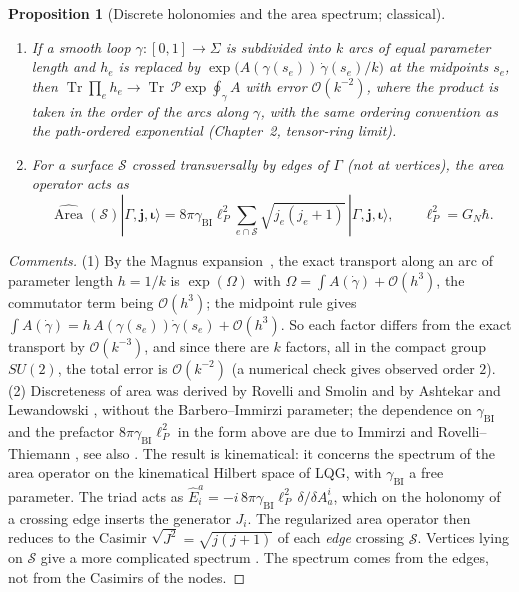 \documentclass[11pt,a4paper,reqno]{amsart}
\newtheorem{proposition}[theorem]{Proposition}
\theoremstyle{definition}
\numberwithin{equation}{section}
\newcommand{\Tr}{\operatorname{Tr}}
\providecommand{\Area}{\operatorname{Area}}
\begin{document}
\begin{proposition}[Discrete holonomies and the area spectrum; classical]
\label{thm:ashtekar_limit}
\leavevmode
\begin{enumerate}
    \item If a smooth loop $\gamma \colon [0,1] \to \Sigma$ is subdivided into $k$ arcs of equal parameter length and $h_e$ is replaced by $\exp\big(A(\gamma(s_e))\,\dot\gamma(s_e)/k\big)$ at the midpoints $s_e$, then $\Tr\prod_e h_e \to \Tr\,\mathcal{P}\exp\oint_\gamma A$ with error $\mathcal{O}(k^{-2})$, where the product is taken in the order of the arcs along $\gamma$, with the same ordering convention as the path-ordered exponential (Chapter~2, tensor-ring limit).
    \item For a surface $\mathcal{S}$ crossed transversally by edges of $\Gamma$ (not at vertices), the area operator acts as
    \begin{equation}
        \label{eq:area_spectrum}
        \widehat{\Area}(\mathcal{S}) |\Gamma, \mathbf{j}, \boldsymbol{\iota}\rangle = 8\pi \gamma_{\mathrm{BI}} \ell_P^2 \sum_{e \cap \mathcal{S}} \sqrt{j_e(j_e + 1)} \, |\Gamma, \mathbf{j}, \boldsymbol{\iota}\rangle, \qquad \ell_P^2 = G_N\hbar.
    \end{equation}
\end{enumerate}
\end{proposition}
\begin{proof}[Comments]
(1) By the Magnus expansion~\cite{magnus1954}, the exact transport along an arc of parameter length $h = 1/k$ is $\exp(\Omega)$ with $\Omega = \int A(\dot\gamma) + \mathcal{O}(h^3)$, the commutator term being $\mathcal{O}(h^3)$; the midpoint rule gives $\int A(\dot\gamma) = h\,A(\gamma(s_e))\dot\gamma(s_e) + \mathcal{O}(h^3)$. So each factor differs from the exact transport by $\mathcal{O}(k^{-3})$, and since there are $k$ factors, all in the compact group $SU(2)$, the total error is $\mathcal{O}(k^{-2})$ (a numerical check gives observed order $2$). (2) Discreteness of area was derived by Rovelli and Smolin \cite{rovellismolin1995} and by Ashtekar and Lewandowski \cite{ashtekarlewandowski1997}, without the Barbero--Immirzi parameter; the dependence on $\gamma_{\mathrm{BI}}$ and the prefactor $8\pi\gamma_{\mathrm{BI}}\ell_P^2$ in the form above are due to Immirzi \cite{immirzi1997} and Rovelli--Thiemann \cite{rovelli1998immirzi}, see also \cite{rovelli2004quantum}. The result is kinematical: it concerns the spectrum of the area operator on the kinematical Hilbert space of LQG, with $\gamma_{\mathrm{BI}}$ a free parameter. The triad acts as $\widehat{E}_i^a = -i\,8\pi\gamma_{\mathrm{BI}}\ell_P^2\,\delta/\delta A_a^i$, which on the holonomy of a crossing edge inserts the generator $J_i$. The regularized area operator then reduces to the Casimir $\sqrt{J^2} = \sqrt{j(j+1)}$ of each \emph{edge} crossing $\mathcal{S}$. Vertices lying on $\mathcal{S}$ give a more complicated spectrum \cite{ashtekarlewandowski1997}. The spectrum comes from the edges, not from the Casimirs of the nodes.
\end{proof}
\end{document}
